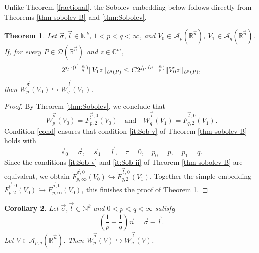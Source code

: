 \documentclass[11pt, reqno]{amsart}
\newtheorem{theorem}{Theorem}[section]
\newtheorem{corollary}[theorem]{Corollary}
\theoremstyle{definition}
\theoremstyle{remark}
\numberwithin{equation}{section}
\newcommand{\A}{\mathscr A}
\newcommand{\R}{\mathbb R}
\newcommand{\vj}{\vec{\textit{\j}}}
\newcommand{\vn}{\vec n}
\newcommand{\aveL}{\textit{\L}}
\begin{document}
Unlike Theorem \ref{fractional}, the Sobolev embedding below
follows directly from Theorems \ref{thm-sobolev-B} and \ref{thm:Sobolev}.

\begin{theorem} \label{sobolev embedding}
Let $\vec \sigma,\vec l\in \mathbb N^k$, $1<p<q<\infty$, and
$V_0\in \A_p(\mathbb R^{\vec n})$, $V_1\in \A_q(\mathbb R^{\vec n})$.
If, for every $P\in\mathscr D(\mathbb R^{\vec n})$ and $z\in\mathbb{C}^{m}$,
\begin{align}\label{cond}
  2^{\vj_P \cdot (\vec l-\frac{\vec n}{q})}\|V_1 z\|_{\aveL^{q}(P)}
  \leq C 2^{\vj_P \cdot (\vec \sigma-\frac{\vec n}{p})} \|V_0 z\|_{\aveL^{p}(P)},
\end{align}
then $\dot W^{\vec \sigma}_p(V_0)\hookrightarrow \dot W^{\vec l}_q(V_1)$.
\end{theorem}

\begin{proof}
By Theorem \ref{thm:Sobolev}, we conclude that
\begin{equation*}
\dot W^{\vec\sigma}_p(V_0)
= \dot F^{\vec\sigma,0}_{p,2}(V_0)
\quad\text{and}\quad
\dot W^{\vec l}_q(V_1)= \dot F^{\vec l,0}_{q,2}(V_1).
\end{equation*}
Condition \eqref{cond} ensures that condition \eqref{it:Sob-v} of Theorem \ref{thm-sobolev-B} holds with
\begin{equation*}
  \vec s_0=\vec\sigma,\quad\vec s_1=\vec l,\quad\tau=0,\quad p_0=p,\quad p_1=q.
\end{equation*}
Since the conditions \eqref{it:Sob-v} and \eqref{it:Sob-ii} of Theorem \ref{thm-sobolev-B} are equivalent, we obtain
$\dot F^{\vec\sigma,0}_{p,\infty}(V_0)
\hookrightarrow \dot F^{\vec l,0}_{q,2}(V_1)$.
Together the simple embedding
$\dot F^{\vec\sigma,0}_{p,2}(V_0) \hookrightarrow
\dot F^{\vec\sigma,0}_{p,\infty}(V_0)$, this
finishes the proof of Theorem \ref{sobolev embedding}.
\end{proof}

\begin{corollary}
Let $\vec \sigma,\vec l\in \mathbb N^k$ and $0<p<q<\infty$ satisfy
\begin{equation}\label{eq:sigma-l}
  (\frac{1}{p}-\frac{1}{q})\vn=\vec\sigma-\vec l.
\end{equation}
Let $V\in\A_{p,q}(\R^{\vn})$. Then $\dot W^{\vec \sigma}_p(V)\hookrightarrow \dot W^{\vec l}_q(V)$.
\end{corollary}
\end{document}
